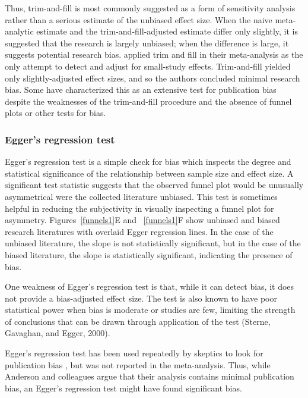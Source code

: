 \documentclass[man]{apa6}
\begin{document}
Thus, trim-and-fill is most commonly suggested as a form of sensitivity analysis rather than a serious estimate of the unbiased effect size. When the naive meta-analytic estimate and the trim-and-fill-adjusted estimate differ only slightly, it is suggested that the research is largely unbiased; when the difference is large, it suggests potential research bias.
\citet{Anderson:etal:2010} applied trim and fill in their meta-analysis as the only attempt to detect and adjust for small-study effects. Trim-and-fill yielded only slightly-adjusted effect sizes, and so the authors concluded minimal research bias.  %
Some have characterized this as an extensive test for publication bias \citep[][pg. 51]{Bushman:Huesmann:2014} despite the weaknesses of the trim-and-fill procedure and the absence of funnel plots or other tests for bias.

\subsubsection{Egger's regression test}
Egger's regression test \citep{Egger:1997} is a simple check for bias which inspects the degree and statistical significance of the relationship between sample size and effect size. A significant test statistic suggests that the observed funnel plot would be unusually asymmetrical were the collected literature unbiased. This test is sometimes helpful in reducing the subjectivity in visually inspecting a funnel plot for asymmetry. Figures~\ref{funnels1}E and ~\ref{funnels1}F show unbiased and biased research literatures with overlaid Egger regression lines. In the case of the unbiased literature, the slope is not statistically significant, but in the case of the biased literature, the slope is statistically significant, indicating the presence of bias.

One weakness of Egger's regression test is that, while it can detect bias, it does not provide a bias-adjusted effect size. The test is also known to have poor statistical power when bias is moderate or studies are few, limiting the strength of conclusions that can be drawn through application of the test (Sterne, Gavaghan, and Egger, 2000).

Egger's regression test has been used repeatedly by skeptics to look for publication bias \citep[e.g.,][]{Ferguson:2007,Ferguson:Kilburn:2009}, but was not reported in the \citet{Anderson:etal:2010} meta-analysis. Thus, while Anderson and colleagues argue that their analysis contains minimal publication bias, an Egger's regression test might have found significant bias.
\end{document}
